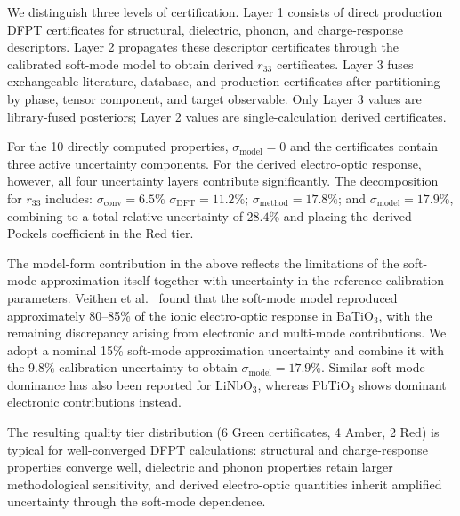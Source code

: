\documentclass[twocolumn,superscriptaddress,amsmath,amssymb,longbibliography]{revtex4-2}
\newcommand{\conv}{\mathrm{conv}}
\newcommand{\meth}{\mathrm{method}}
\begin{document}
We distinguish three levels of certification. Layer 1 consists of direct production DFPT certificates for structural, dielectric, phonon, and charge-response descriptors. Layer 2 propagates these descriptor certificates through the calibrated soft-mode model to obtain derived $r_{33}$ certificates. Layer 3 fuses exchangeable literature, database, and production certificates after partitioning by phase, tensor component, and target observable. Only Layer 3 values are library-fused posteriors; Layer 2 values are single-calculation derived certificates.

For the 10 directly computed properties,
$\sigma_{\mathrm{model}} = 0$ and the certificates contain three active uncertainty
components. For the derived electro-optic response, however, all four uncertainty layers contribute significantly. The decomposition for $r_{33}$ includes: $\sigma_\conv = 6.5\%$
$\sigma_{\mathrm{DFT}} = 11.2\%$;
$\sigma_\meth = 17.8\%$;
and $\sigma_{\mathrm{model}} = 17.9\%$, combining to a total relative uncertainty of $28.4\%$ and placing the derived Pockels coefficient in the Red tier.

The model-form contribution in the above reflects the limitations of the soft-mode approximation itself together with uncertainty in the reference calibration parameters. Veithen et al.\ \cite{Veithen2005} found that the soft-mode model reproduced approximately 80--85\% of the ionic electro-optic response in BaTiO$_3$, with the remaining discrepancy arising from electronic and multi-mode contributions. We adopt a nominal 15\% soft-mode approximation uncertainty and combine it with the 9.8\% calibration uncertainty to obtain $\sigma_{\mathrm{model}} = 17.9\%$.
Similar soft-mode dominance has also been reported for LiNbO$_3$\cite{Veithen2004_PRL}, whereas PbTiO$_3$ shows dominant electronic contributions instead.

The resulting quality tier
distribution (6 Green certificates, 4 Amber, 2 Red) is typical for well-converged
DFPT calculations: structural and charge-response properties converge well,
dielectric and phonon properties retain larger methodological sensitivity,  and derived electro-optic quantities inherit amplified uncertainty through the soft-mode dependence.
\end{document}
